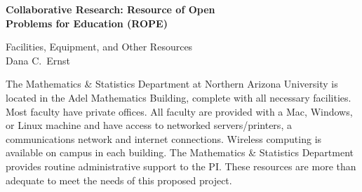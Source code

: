 \documentclass[11pt]{article}
\begin{document}
\begin{center}
{\Large \textbf{Collaborative Research: Resource of Open \\ 
Problems for Education (ROPE)}}

\bigskip

{\Large Facilities, Equipment, and Other Resources}\\
\smallskip
Dana C.~Ernst
\end{center}

\thispagestyle{empty}

\noindent The Mathematics \& Statistics Department at Northern Arizona University is located in the Adel Mathematics Building, complete with all necessary facilities. Most faculty have private offices.  All faculty are provided with a Mac, Windows, or Linux machine and have access to networked servers/printers, a communications network and internet connections.  Wireless computing is available on campus in each building.  The Mathematics \& Statistics Department provides routine administrative support to the PI.  These resources are more than adequate to meet the needs of this proposed project.
\end{document}
